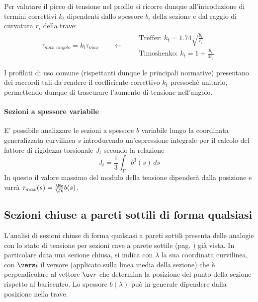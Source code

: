     	
    		
    		Per valutare il picco di tensione nel profilo si ricorre dunque all'introduzione di termini correttivi $k_t$ dipendenti dallo spessore $b_i$ della sezione e dal raggio di curvatura $r_i$ della trave:
    		\[ \tau_{max,angolo} = k_t \tau_{max} \qquad \leftarrow \quad \begin{aligned}
    			& \textrm{Treffer: } k_t= 1.74 \sqrt{\frac{b_i}{r_i}} \\
    			& \textrm{Timoshenko: } k_t = 1 + \frac{b_i}{4r_i}
    		\end{aligned} \]
    		\begin{nota}
    			I profilati di uso comune (rispettanti dunque le principali normative) presentano dei raccordi tali da rendere il coefficiente correttivo $k_t$ pressoché unitario, permettendo dunque di trascurare l'aumento di tensione nell'angolo.
    		\end{nota}
    		
    		\paragraph{Sezioni a spessore variabile} E' possibile analizzare le sezioni a spessore $b$ variabile lungo la coordinata generalizzata curvilinea $s$ introducendo un'espressione integrale per il calcolo del fattore di rigidezza torsionale $J_t$ secondo la relazione
    		\[ J_t = \frac 1 3 \int_\Gamma b^3(s) \, ds \]
    		In questo il valore massimo del modulo della tensione dipenderà dalla posizione e varrà $\tau_{max}(s) = \frac \Mz \Jt b(s)$.
    	
    	\subsection{Sezioni chiuse a pareti sottili di forma qualsiasi}
    		L'analisi di sezioni chiuse di forma qualsiasi a pareti sottili presenta delle analogie con lo stato di tensione per sezioni cave a parete sottile (pag. \pageref{sec:torst:paretesottile}) già vista. In particolare data una sezione chiusa, si indica con $\lambda$ la sua coordinata curvilinea, con $\vers i$ il versore (applicato sulla linea media della sezione) che è perpendicolare al vettore $\ov r$ che determina la posizione del punto della sezione rispetto al baricentro. Lo spessore $b(\lambda)$ può in generale dipendere dalla posizione nella trave.
    		
